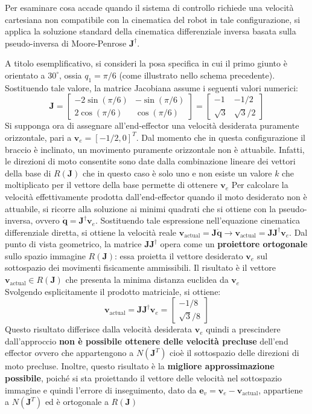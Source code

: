 \documentclass[11pt, a4paper]{report}
\begin{document}
Per esaminare cosa accade quando il sistema di controllo richiede una velocità cartesiana non compatibile con la cinematica del robot in tale configurazione, si applica la soluzione standard della cinematica differenziale inversa basata sulla pseudo-inversa di Moore-Penrose $\bm{J}^\dagger$.

A titolo esemplificativo, si consideri la posa specifica in cui il primo giunto è orientato a $30^\circ$, ossia $q_1 = \pi/6$ (come illustrato nello schema precedente). Sostituendo tale valore, la matrice Jacobiana assume i seguenti valori numerici:
\[
    \bm{J} = \begin{bmatrix} -2\sin(\pi/6) & -\sin(\pi/6) \\ 2\cos(\pi/6) & \cos(\pi/6) \end{bmatrix} = \begin{bmatrix} -1 & -1/2 \\ \sqrt{3} & \sqrt{3}/2 \end{bmatrix}
\]
Si supponga ora di assegnare all'end-effector una velocità desiderata puramente orizzontale, pari a $\bm{v}_e = [-1/2, 0]^T$. Dal momento che in questa configurazione il braccio è inclinato, un movimento puramente orizzontale non è attuabile. Infatti, le direzioni di moto consentite sono date dalla combinazione lineare dei vettori della base di $R(\bm{J})$ che in questo caso è solo uno e non esiste un valore $k$ che moltiplicato per il vettore della base permette di ottenere $\bm{v}_e$
\newpage
Per calcolare la velocità effettivamente prodotta dall'end-effector quando il moto desiderato non è attuabile, si ricorre alla soluzione ai minimi quadrati che si ottiene con la pseudo-inversa, ovvero $\dot{\bm{q}} = \bm{J}^\dagger \bm{v}_e$. Sostituendo tale espressione nell'equazione cinematica differenziale diretta, si ottiene la velocità reale $\bm{v}_{\text{actual}} = \bm{J}\dot{\bm{q}} \longrightarrow \bm{v}_{\text{actual}} = \bm{J}\bm{J}^\dagger \bm{v}_e$. Dal punto di vista geometrico, la matrice $\bm{J}\bm{J}^\dagger$ opera come un \textbf{proiettore ortogonale} sullo spazio immagine $R(\bm{J})$: essa proietta il vettore desiderato $\bm{v}_e$ sul sottospazio dei movimenti fisicamente ammissibili. Il risultato è il vettore $\bm{v}_{\text{actual}} \in R(\bm{J})$ che presenta la minima distanza euclidea da $\bm{v}_e$\\
Svolgendo esplicitamente il prodotto matriciale, si ottiene:
\[
    \bm{v}_{\text{actual}} = \bm{J}\bm{J}^\dagger\bm{v}_e =
    \begin{bmatrix}
        -1/8 \\
        \sqrt{3}/8
    \end{bmatrix}
\]
Questo risultato differisce dalla velocità desiderata $\bm{v}_e$ quindi a prescindere dall'approccio \textbf{non è possibile ottenere delle velocità precluse} dell'end effector ovvero che appartengono a $N(\bm{J}^T)$ cioè il sottospazio delle direzioni di moto precluse. Inoltre, questo risultato è la \textbf{migliore approssimazione possibile}, poiché si sta proiettando il vettore delle velocità nel sottospazio immagine e quindi l'errore di inseguimento, dato da $\bm{e}_v = \bm{v}_e - \bm{v}_{\text{actual}}$, appartiene a $N(\bm{J}^T)$ ed è ortogonale a $R(\bm{J})$
\end{document}
